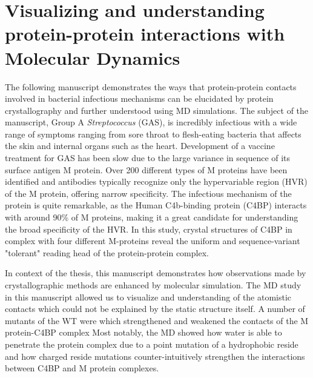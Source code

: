 \documentclass[12pt]{ucsddissertation}
\begin{document}
\chapter{Visualizing and understanding protein-protein interactions with Molecular Dynamics}\label{cosmo_paper}
\vspace*{-1cm}
The following manuscript demonstrates the ways that protein-protein contacts involved in bacterial infectious mechanisms can be elucidated by protein crystallography and further understood using MD simulations. The subject of the manuscript, Group A \textit{Streptococcus} (GAS), is incredibly infectious with a wide range of symptoms ranging from sore throat to flesh-eating bacteria that affects the skin and internal organs such as the heart. Development of a vaccine treatment for GAS has been slow due to the large variance in sequence of its surface antigen M protein. Over 200 different types of M proteins have been identified and antibodies typically recognize only the hypervariable region (HVR) of the M protein, offering narrow specificity. The infectious mechanism of the protein is quite remarkable, as the Human C4b-binding protein (C4BP) interacts with around 90\% of M proteins, making it a great candidate for understanding the broad specificity of the HVR. In this study, crystal structures of C4BP in complex with four different M-proteins reveal the uniform and sequence-variant "tolerant" reading head of the protein-protein complex. 

In context of the thesis, this manuscript demonstrates how observations made by crystallographic methods are enhanced by molecular simulation. The MD study in this manuscript allowed us to visualize and understanding of the atomistic contacts which could not be explained by the static structure itself.
A number of mutants of the WT were which strengthened and weakened the contacts of the M protein-C4BP complex  Most notably, the MD showed how water is able to penetrate the protein complex due to a point mutation of a hydrophobic reside and how charged reside mutations counter-intuitively strengthen the interactions between C4BP and M protein complexes.   \\
\end{document}
